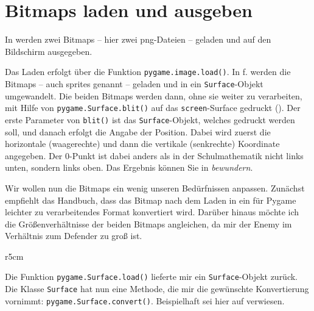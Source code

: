 \newpage
\section{Bitmaps laden und ausgeben}\label{secBitmapLaden}


In  werden zwei Bitmaps -- hier zwei png-Dateien -- geladen und auf den Bildschirm ausgegeben. 

Das Laden erfolgt über die Funktion \texttt{pygame.image.load()}. In f. werden die Bitmaps -- auch \glspl{sprite} genannt -- geladen und in ein \texttt{Surface}-Objekt umgewandelt. Die beiden Bitmaps werden dann, ohne sie weiter zu verarbeiten, mit Hilfe von \texttt{pygame.Sur\-face.\-blit()} auf das \texttt{screen}-Surface gedruckt (). Der erste Parameter von \texttt{blit()} ist das \texttt{Surface}-Objekt, welches gedruckt werden soll, und danach erfolgt die Angabe der Position. Dabei wird zuerst die horizontale (waagerechte) und dann die vertikale (senkrechte) Koordinate angegeben. Der 0-Punkt ist dabei anders als in der Schulmathematik nicht links unten, sondern links oben. Das Ergebnis können Sie in  \emph{bewundern}.


Wir wollen nun die Bitmaps ein wenig unseren Bedürfnissen anpassen. Zunächst empfiehlt das Handbuch, dass das Bitmap nach dem Laden in ein für Pygame leichter zu verarbeitendes Format konvertiert wird. Darüber hinaus möchte ich die Größenverhältnisse der beiden Bitmaps angleichen, da mir der Enemy im Verhältnis zum Defender zu groß ist. 


\begin{wrapfigure}[9]{r}{5cm}%
    \vspace{-1em}%
\end{wrapfigure}%
Die Funktion \texttt{pygame.Surface.load()} lieferte mir ein \texttt{Surface}-Objekt zurück. Die Klasse \texttt{Surface} hat nun eine Methode, die mir die gewünschte Konvertierung vornimmt: \texttt{pygame.Surface.convert()}.\label{pageTransparenz} Beispielhaft sei hier auf  verwiesen. 


